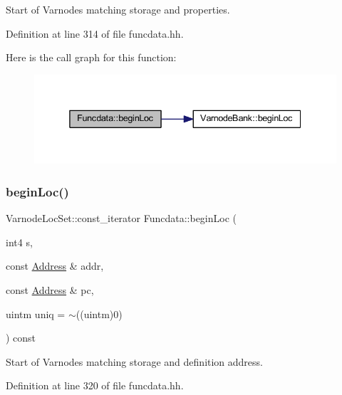 Start of Varnodes matching storage and properties. 



Definition at line 314 of file funcdata.\+hh.

Here is the call graph for this function\+:
\nopagebreak
\begin{figure}[H]
\begin{center}
\leavevmode
\includegraphics[width=338pt]{class_funcdata_afc1213896328c86680dc05c9c5daa7c5_cgraph}
\end{center}
\end{figure}
\mbox{\label{class_funcdata_a1ad396df61c154668d1f768918b46254}} 
\subsubsection{\texorpdfstring{beginLoc()}{beginLoc()}\hspace{0.1cm}{\footnotesize\ttfamily [6/6]}}
{\footnotesize\ttfamily Varnode\+Loc\+Set\+::const\+\_\+iterator Funcdata\+::begin\+Loc (\begin{DoxyParamCaption}\item[{int4}]{s,  }\item[{const \mbox{\hyperlink{class_address}{Address}} \&}]{addr,  }\item[{const \mbox{\hyperlink{class_address}{Address}} \&}]{pc,  }\item[{uintm}]{uniq = {\ttfamily $\sim$((uintm)0)} }\end{DoxyParamCaption}) const\hspace{0.3cm}{\ttfamily [inline]}}



Start of Varnodes matching storage and definition address. 



Definition at line 320 of file funcdata.\+hh.

